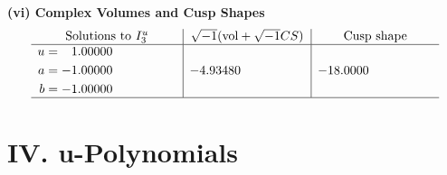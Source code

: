 \documentclass[1p]{elsarticle_modified}
\theoremstyle{definition}
\newcommand{\I}{\sqrt{-1}}
\begin{document}
\newpage\flushleft \textbf{(vi) Complex Volumes and Cusp Shapes}
$$\begin{array}{c|c|c}  
\text{Solutions to }I^u_{3}& \I (\text{vol} + \sqrt{-1}CS) & \text{Cusp shape}\\
 \hline 
\begin{aligned}
u &= \phantom{-}1.00000\phantom{ +0.000000I} \\
a &= -1.00000\phantom{ +0.000000I} \\
b &= -1.00000\phantom{ +0.000000I}\end{aligned}
 & -4.93480\phantom{ +0.000000I} & -18.0000\phantom{ +0.000000I}\\
 \hline 
 \end{array}$$\newpage
\newpage\renewcommand{\arraystretch}{1}
\centering \section*{ IV. u-Polynomials}
\end{document}
